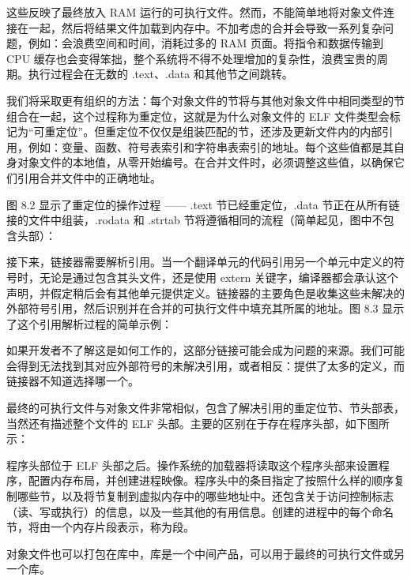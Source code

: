 这些反映了最终放入 RAM 运行的可执行文件。然而，不能简单地将对象文件连接在一起，然后将结果文件加载到内存中。不加考虑的合并会导致一系列复杂问题，例如：会浪费空间和时间，消耗过多的 RAM 页面。将指令和数据传输到 CPU 缓存也会变得笨拙，整个系统将不得不处理增加的复杂性，浪费宝贵的周期。执行过程会在无数的 .text、.data 和其他节之间跳转。

我们将采取更有组织的方法：每个对象文件的节将与其他对象文件中相同类型的节组合在一起，这个过程称为重定位，这就是为什么对象文件的 ELF 文件类型会标记为“可重定位”。但重定位不仅仅是组装匹配的节，还涉及更新文件内的内部引用，例如：变量、函数、符号表索引和字符串表索引的地址。每个这些值都是其自身对象文件的本地值，从零开始编号。在合并文件时，必须调整这些值，以确保它们引用合并文件中的正确地址。

图 8.2 显示了重定位的操作过程 —— .text 节已经重定位，.data 节正在从所有链接的文件中组装，.rodata 和 .strtab 节将遵循相同的流程（简单起见，图中不包含头部）：


接下来，链接器需要解析引用。当一个翻译单元的代码引用另一个单元中定义的符号时，无论是通过包含其头文件，还是使用 extern 关键字，编译器都会承认这个声明，并假定稍后会有其他单元提供定义。链接器的主要角色是收集这些未解决的外部符号引用，然后识别并在合并的可执行文件中填充其所属的地址。图 8.3 显示了这个引用解析过程的简单示例：


如果开发者不了解这是如何工作的，这部分链接可能会成为问题的来源。我们可能会得到无法找到其对应外部符号的未解决引用，或者相反：提供了太多的定义，而链接器不知道选择哪一个。

最终的可执行文件与对象文件非常相似，包含了解决引用的重定位节、节头部表，当然还有描述整个文件的 ELF 头部。主要的区别在于存在程序头部，如下图所示：


程序头部位于 ELF 头部之后。操作系统的加载器将读取这个程序头部来设置程序，配置内存布局，并创建进程映像。程序头中的条目指定了按照什么样的顺序复制哪些节，以及将节复制到虚拟内存中的哪些地址中。还包含关于访问控制标志（读、写或执行）的信息，以及一些其他的有用信息。创建的进程中的每个命名节，将由一个内存片段表示，称为段。

对象文件也可以打包在库中，库是一个中间产品，可以用于最终的可执行文件或另一个库。


